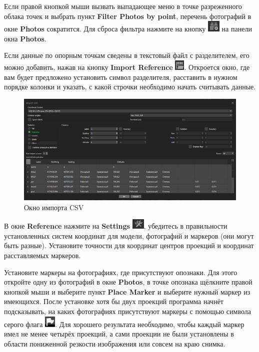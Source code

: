 \documentclass[
  12pt,
]{book}
\begin{document}
Если правой кнопкой мыши вызвать выпадающее меню в точке разреженного облака точек и выбрать пункт \textbf{Filter Photos by point}, перечень фотографий в окне \textbf{Photos} сократится. Для сброса фильтра нажмите на кнопку \includegraphics{images/Ref18/Reset_Filter.png} на панели окна \textbf{Photos}.

Если данные по опорным точкам сведены в текстовый файл с разделителем, его можно добавить, нажав на кнопку \textbf{Import Reference} \includegraphics{images/Ref18/Import_Reference.png}. Откроется окно, где вам будет предложено установить символ разделителя, расставить в нужном порядке колонки и указать, с какой строчки необходимо начать считывать данные.

\begin{figure}
\centering
\includegraphics{images/Ref18/Import_CSV.png}
\caption{Окно импорта CSV}
\end{figure}

В окне \textbf{Reference} нажмите на \textbf{Settings} \includegraphics{images/Ref18/Settings.png}, убедитесь в правильности установленных систем координат для модели, фотографий и маркеров (они могут быть разные). Установите точности для координат центров проекций и координат расставляемых маркеров.

Установите маркеры на фотографиях, где присутствуют опознаки. Для этого откройте одну из фотографий в окне \textbf{Photos}, в точке опознака щёлкните правой кнопкой мыши и выберите пункт \textbf{Place Marker} и выберите нужный маркер из имеющихся. После установке хотя бы двух проекций программа начнёт подсказывать, на каких фотографиях присутствуют маркеры с помощью символа серого флага \includegraphics{images/Ref18/Grey_Flag.png}. Для хорошего результата необходимо, чтобы каждый маркер имел не менее четырёх проекций, а сами проекции не были установлены в области пониженной резкости изображения или совсем на краю снимка.
\end{document}
